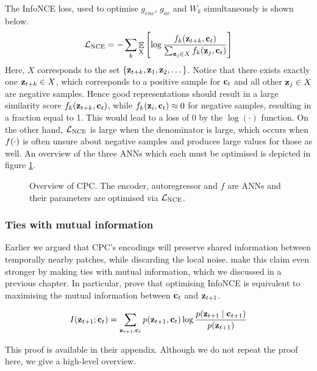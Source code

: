 	The InfoNCE loss, used to optimise $g_{enc}$, $g_{ar}$ and $W_k$ simultaneously is shown below. 
	\begin{equation} %
		\Lnce = - \sum_{k} \expected{\textsubscript{X}} \left[ \log \nceprediction \right] \label{eq:NCE_loss}
	\end{equation}
	Here, $X$ corresponds to the set ${ \left\{ \mathbf{z}_{t+k}, \mathbf{z}_1, \mathbf{z}_2, \dots \right\} }$. Notice that there exists exactly one $\mathbf{z}_{t+k} \in X$, which corresponds to a positive sample for $\mathbf{c}_t$ and all other $\mathbf{z}_j \in X$ are negative samples.  Hence good representations should result in a large similarity score $f_k(\mathbf{z}_{t+k}, \mathbf{c}_t)$, while $f_k(\mathbf{z}_i, \mathbf{c}_t) \approx 0$ for negative samples, resulting in a fraction equal to 1. This would lead to a loss of 0 by the $\log(\cdot)$ function. On the other hand, $\mathcal{L}_{\text{NCE}}$ is large when the denominator is large, which occurs when $f(\cdot)$ is often unsure about negative samples and produces large values for those as well. An overview of the three ANNs which each must be optimised is depicted in figure \ref{fig:cpc-my-overview}.
	

	\begin{figure}
		\hspace{2cm}
		\centering
		

		\caption{Overview of CPC. The encoder, autoregressor and $f$ are ANNs and their parameters are optimised via $\mathcal{L}_{\text{NCE}}$.}
		\label{fig:cpc-my-overview}
	\end{figure}
	
	
\subsubsection{Ties with mutual information} \label{cha:bg_cpc_ties_w_mi}
	Earlier we argued that CPC's encodings will preserve shared information between temporally nearby patches, while discarding the local noise. \cite{oordRepresentationLearningContrastive2019} make this claim even stronger by making ties with mutual information, which we discussed in a previous chapter. In particular, \citeauthor{oordRepresentationLearningContrastive2019} prove that optimising InfoNCE is equivalent to maximising the mutual information between $\mathbf{c}_t$ and $\mathbf{z}_{t+1}$. 
	
	\begin{equation} %
		I(\ztone; \ct) = \sum_{\ztone, \ct} p(\ztone, \ct) \log \frac{p(\ztone \mid \ctone)}{p(\ztone)}
	\end{equation}
	
	This proof is available in their appendix. Although we do not repeat the proof here, we give a high-level overview.
	
